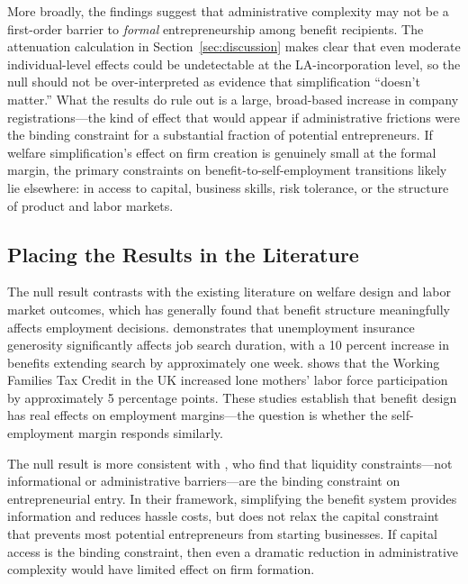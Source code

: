 \documentclass[12pt]{article}
\begin{document}
More broadly, the findings suggest that administrative complexity may not be a first-order barrier to \textit{formal} entrepreneurship among benefit recipients. The attenuation calculation in Section~\ref{sec:discussion} makes clear that even moderate individual-level effects could be undetectable at the LA-incorporation level, so the null should not be over-interpreted as evidence that simplification ``doesn't matter.'' What the results do rule out is a large, broad-based increase in company registrations---the kind of effect that would appear if administrative frictions were the binding constraint for a substantial fraction of potential entrepreneurs. If welfare simplification's effect on firm creation is genuinely small at the formal margin, the primary constraints on benefit-to-self-employment transitions likely lie elsewhere: in access to capital, business skills, risk tolerance, or the structure of product and labor markets.

\subsection{Placing the Results in the Literature}

The null result contrasts with the existing literature on welfare design and labor market outcomes, which has generally found that benefit structure meaningfully affects employment decisions. \citet{chetty2008moral} demonstrates that unemployment insurance generosity significantly affects job search duration, with a 10 percent increase in benefits extending search by approximately one week. \citet{blundell2006earned} shows that the Working Families Tax Credit in the UK increased lone mothers' labor force participation by approximately 5 percentage points. These studies establish that benefit design has real effects on employment margins---the question is whether the self-employment margin responds similarly.

The null result is more consistent with \citet{hurst2004liquidity}, who find that liquidity constraints---not informational or administrative barriers---are the binding constraint on entrepreneurial entry. In their framework, simplifying the benefit system provides information and reduces hassle costs, but does not relax the capital constraint that prevents most potential entrepreneurs from starting businesses. If capital access is the binding constraint, then even a dramatic reduction in administrative complexity would have limited effect on firm formation.
\end{document}
